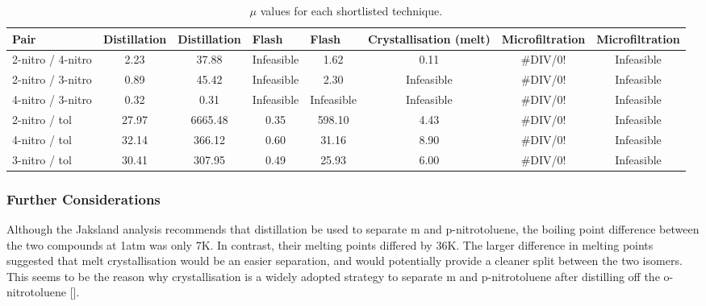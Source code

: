 \begin{landscape}
\begin{table}[]
\centering
\caption{$\mu$ values for each shortlisted technique.}
\label{tab:separation pair ratio}
\begin{tabular}{@{}lccccccc@{}}
\toprule
Pair              & \multicolumn{1}{l}{Distillation} & \multicolumn{1}{l}{Distillation} & \multicolumn{1}{l}{Flash} & \multicolumn{1}{l}{Flash} & \multicolumn{1}{l}{Crystallisation (melt)} & \multicolumn{1}{l}{Microfiltration} & \multicolumn{1}{l}{Microfiltration} \\ \midrule
2-nitro / 4-nitro & 2.23                             & \cellcolor[HTML]{C6E0B4}37.88    & Infeasible                & 1.62                      & 0.11                                       & \#DIV/0!                            & Infeasible                          \\
2-nitro / 3-nitro & 0.89                             & \cellcolor[HTML]{C6E0B4}45.42    & Infeasible                & 2.30                      & Infeasible                                 & \#DIV/0!                            & Infeasible                          \\
4-nitro / 3-nitro & \cellcolor[HTML]{C6E0B4}0.32     & 0.31                             & Infeasible                & Infeasible                & Infeasible                                 & \#DIV/0!                            & Infeasible                          \\
2-nitro / tol     & 27.97                            & \cellcolor[HTML]{C6E0B4}6665.48  & 0.35                      & 598.10                    & 4.43                                       & \#DIV/0!                            & Infeasible                          \\
4-nitro / tol     & 32.14                            & \cellcolor[HTML]{C6E0B4}366.12   & 0.60                      & 31.16                     & 8.90                                       & \#DIV/0!                            & Infeasible                          \\
3-nitro / tol     & 30.41                            & \cellcolor[HTML]{C6E0B4}307.95   & 0.49                      & 25.93                     & 6.00                                       & \#DIV/0!                            & Infeasible                          \\ \bottomrule
\end{tabular}
\end{table}

\subsubsection{Further Considerations}
Although the Jaksland analysis recommends that distillation be used to separate m and p-nitrotoluene, the boiling point difference between the two compounds at 1atm was only 7K. In contrast, their melting points differed by 36K. The larger difference in melting points suggested that melt crystallisation would be an easier separation, and would potentially provide a cleaner split between the two isomers. This seems to be the reason why crystallisation is a widely adopted strategy to separate m and p-nitrotoluene after distilling off the o-nitrotoluene []. 

\end{landscape}